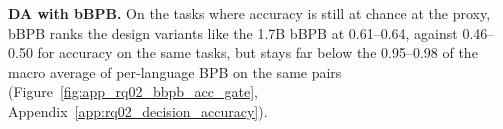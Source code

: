 


\textbf{DA with bBPB.}
On the tasks where accuracy is still at chance at the proxy, bBPB ranks the design variants like the 1.7B bBPB at 0.61--0.64, against 0.46--0.50 for accuracy on the same tasks, but stays far below the 0.95--0.98 of the macro average of per-language BPB on the same pairs (Figure~\ref{fig:app_rq02_bbpb_acc_gate}, Appendix~\ref{app:rq02_decision_accuracy}).



